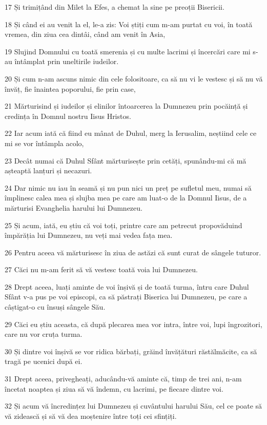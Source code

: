 \par 17 Și trimițând din Milet la Efes, a chemat la sine pe preoții Bisericii.
\par 18 Și când ei au venit la el, le-a zis: Voi știți cum m-am purtat cu voi, în toată vremea, din ziua cea dintâi, când am venit în Asia,
\par 19 Slujind Domnului cu toată smerenia și cu multe lacrimi și încercări care mi s-au întâmplat prin uneltirile iudeilor.
\par 20 Și cum n-am ascuns nimic din cele folositoare, ca să nu vi le vestesc și să nu vă învăț, fie înaintea poporului, fie prin case,
\par 21 Mărturisind și iudeilor și elinilor întoarcerea la Dumnezeu prin pocăință și credința în Domnul nostru Iisus Hristos.
\par 22 Iar acum iată că fiind eu mânat de Duhul, merg la Ierusalim, neștiind cele ce mi se vor întâmpla acolo,
\par 23 Decât numai că Duhul Sfânt mărturisește prin cetăți, spunându-mi că mă așteaptă lanțuri și necazuri.
\par 24 Dar nimic nu iau în seamă și nu pun nici un preț pe sufletul meu, numai să împlinesc calea mea și slujba mea pe care am luat-o de la Domnul Iisus, de a mărturisi Evanghelia harului lui Dumnezeu.
\par 25 Și acum, iată, eu știu că voi toți, printre care am petrecut propovăduind împărăția lui Dumnezeu, nu veți mai vedea fața mea.
\par 26 Pentru aceea vă mărturisesc în ziua de astăzi că sunt curat de sângele tuturor.
\par 27 Căci nu m-am ferit să vă vestesc toată voia lui Dumnezeu.
\par 28 Drept aceea, luați aminte de voi înșivă și de toată turma, întru care Duhul Sfânt v-a pus pe voi episcopi, ca să păstrați Biserica lui Dumnezeu, pe care a câștigat-o cu însuși sângele Său.
\par 29 Căci eu știu aceasta, că după plecarea mea vor intra, între voi, lupi îngrozitori, care nu vor cruța turma.
\par 30 Și dintre voi înșivă se vor ridica bărbați, grăind învățături răstălmăcite, ca să tragă pe ucenici după ei.
\par 31 Drept aceea, privegheați, aducându-vă aminte că, timp de trei ani, n-am încetat noaptea și ziua să vă îndemn, cu lacrimi, pe fiecare dintre voi.
\par 32 Și acum vă încredințez lui Dumnezeu și cuvântului harului Său, cel ce poate să vă zidească și să vă dea moștenire între toți cei sfințiți.

